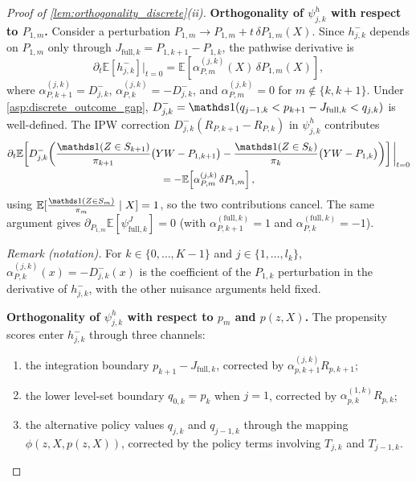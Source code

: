 \begin{proof}[Proof of \cref{lem:orthogonality_discrete}\textup{(ii)}]
\textbf{Orthogonality of $\psi_{j,k}^h$ with respect to $P_{1,m}$.}
Consider a perturbation $P_{1,m} \to P_{1,m} + t\,\delta P_{1,m}(X)$. Since $h_{j,k}^-$ depends on $P_{1,m}$ only through $J_{\mathrm{full},k} = P_{1,k+1} - P_{1,k}$, the pathwise derivative is
\[
    \partial_t \mathbb{E}[h_{j,k}^-] \big|_{t=0} = \mathbb{E}\!\left[\alpha_{P,m}^{(j,k)}(X)\,\delta P_{1,m}(X)\right],
\]
where $\alpha_{P,k+1}^{(j,k)} = D_{j,k}^-$, $\alpha_{P,k}^{(j,k)} = -D_{j,k}^-$, and $\alpha_{P,m}^{(j,k)} = 0$ for $m \notin \{k,k{+}1\}$. Under \cref{asp:discrete_outcome_gap}, $D_{j,k}^- = \indicator(q_{j-1,k} < p_{k+1} - J_{\mathrm{full},k} < q_{j,k})$ is well-defined. The IPW correction $D_{j,k}^-(R_{P,k+1} - R_{P,k})$ in $\psi_{j,k}^h$ contributes
\begin{multline*}
    \partial_t \mathbb{E}\!\left[D_{j,k}^-\!\left(\frac{\indicator(Z \in S_{k+1})}{\pi_{k+1}}\bigl(YW - P_{1,k+1}\bigr) - \frac{\indicator(Z \in S_k)}{\pi_k}\bigl(YW - P_{1,k}\bigr)\right)\right]\bigg|_{t=0} \\
    = -\mathbb{E}\!\left[\alpha_{P,m}^{(j,k)}\,\delta P_{1,m}\right],
\end{multline*}
using $\mathbb{E}[\frac{\indicator(Z \in S_m)}{\pi_m} \mid X] = 1$, so the two contributions cancel. The same argument gives $\partial_{P_{1,m}}\mathbb{E}[\psi_{\mathrm{full},k}^J] = 0$ (with $\alpha_{P,k+1}^{(\mathrm{full},k)} = 1$ and $\alpha_{P,k}^{(\mathrm{full},k)} = -1$).

\noindent\textit{Remark (notation).} For $k\in\{0,\ldots,K-1\}$ and $j\in\{1,\ldots,l_k\}$, $\alpha_{P,k}^{(j,k)}(x)=-D_{j,k}^{-}(x)$ is the coefficient of the $P_{1,k}$ perturbation in the derivative of $h_{j,k}^{-}$, with the other nuisance arguments held fixed.


\textbf{Orthogonality of $\psi_{j,k}^h$ with respect to $p_m$ and $p(z,X)$.}
The propensity scores enter $h_{j,k}^-$ through three channels:

\begin{enumerate}[label=(\alph*)]
    \item the integration boundary $p_{k+1} - J_{\mathrm{full},k}$, corrected by $\alpha_{p,k+1}^{(j,k)} R_{p,k+1}$;
    \item the lower level-set boundary $q_{0,k} = p_k$ when $j = 1$, corrected by $\alpha_{p,k}^{(1,k)} R_{p,k}$;
    \item the alternative policy values $q_{j,k}$ and $q_{j-1,k}$ through the mapping $\phi(z,X,p(z,X))$, corrected by the policy terms involving $T_{j,k}$ and $T_{j-1,k}$.
\end{enumerate}


\end{proof}
